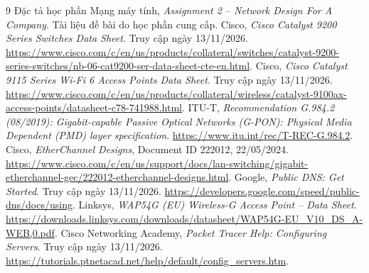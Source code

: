 \documentclass[
  11pt,
]{article}
\begin{document}
\clearpage
{}
{}
\begin{thebibliography}{9}
\setlength{\itemsep}{5pt}
 Đặc tả học phần Mạng máy tính, \textit{Assignment 2 -- Network Design For A Company}. Tài liệu đề bài do học phần cung cấp.
 Cisco, \textit{Cisco Catalyst 9200 Series Switches Data Sheet}. Truy cập ngày 13/11/2026. \url{https://www.cisco.com/c/en/us/products/collateral/switches/catalyst-9200-series-switches/nb-06-cat9200-ser-data-sheet-cte-en.html}.
 Cisco, \textit{Cisco Catalyst 9115 Series Wi-Fi 6 Access Points Data Sheet}. Truy cập ngày 13/11/2026. \url{https://www.cisco.com/c/en/us/products/collateral/wireless/catalyst-9100ax-access-points/datasheet-c78-741988.html}.
 ITU-T, \textit{Recommendation G.984.2 (08/2019): Gigabit-capable Passive Optical Networks (G-PON): Physical Media Dependent (PMD) layer specification}. \url{https://www.itu.int/rec/T-REC-G.984.2}.
 Cisco, \textit{EtherChannel Designs}, Document ID 222012, 22/05/2024. \url{https://www.cisco.com/c/en/us/support/docs/lan-switching/gigabit-etherchannel-gec/222012-etherchannel-designs.html}.
 Google, \textit{Public DNS: Get Started}. Truy cập ngày 13/11/2026. \url{https://developers.google.com/speed/public-dns/docs/using}.
 Linksys, \textit{WAP54G (EU) Wireless-G Access Point -- Data Sheet}. \url{https://downloads.linksys.com/downloads/datasheet/WAP54G-EU_V10_DS_A-WEB,0.pdf}.
 Cisco Networking Academy, \textit{Packet Tracer Help: Configuring Servers}. Truy cập ngày 13/11/2026. \url{https://tutorials.ptnetacad.net/help/default/config_servers.htm}.
\end{thebibliography}
\end{document}
